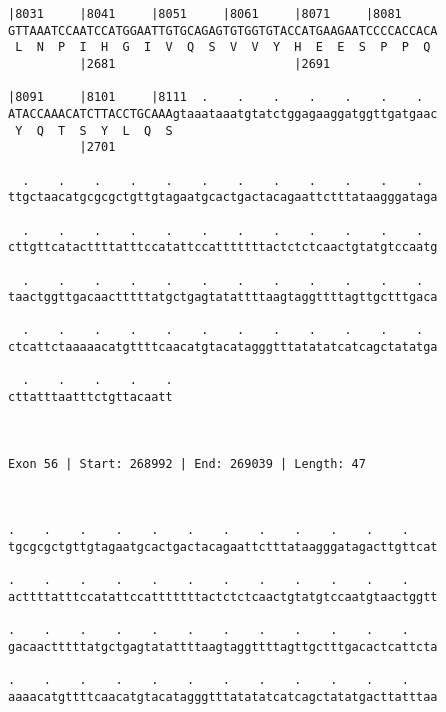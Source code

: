 \documentclass{article}
\begin{document}
\begin{Verbatim}
|8031     |8041     |8051     |8061     |8071     |8081     
GTTAAATCCAATCCATGGAATTGTGCAGAGTGTGGTGTACCATGAAGAATCCCCACCACA
 L  N  P  I  H  G  I  V  Q  S  V  V  Y  H  E  E  S  P  P  Q 
          |2681                         |2691               
  
|8091     |8101     |8111  .    .    .    .    .    .    .  
ATACCAAACATCTTACCTGCAAAgtaaataaatgtatctggagaaggatggttgatgaac
 Y  Q  T  S  Y  L  Q  S                                     
          |2701                                             
  
  .    .    .    .    .    .    .    .    .    .    .    .  
ttgctaacatgcgcgctgttgtagaatgcactgactacagaattctttataagggataga
                                                            
  .    .    .    .    .    .    .    .    .    .    .    .  
cttgttcatacttttatttccatattccatttttttactctctcaactgtatgtccaatg
                                                            
  .    .    .    .    .    .    .    .    .    .    .    .  
taactggttgacaactttttatgctgagtatattttaagtaggttttagttgctttgaca
                                                            
  .    .    .    .    .    .    .    .    .    .    .    .  
ctcattctaaaaacatgttttcaacatgtacatagggtttatatatcatcagctatatga
                                                            
  .    .    .    .    .
cttatttaatttctgttacaatt
                       
                       
 
Exon 56 | Start: 268992 | End: 269039 | Length: 47



.    .    .    .    .    .    .    .    .    .    .    .    
tgcgcgctgttgtagaatgcactgactacagaattctttataagggatagacttgttcat
                                                            
.    .    .    .    .    .    .    .    .    .    .    .    
acttttatttccatattccatttttttactctctcaactgtatgtccaatgtaactggtt
                                                            
.    .    .    .    .    .    .    .    .    .    .    .    
gacaactttttatgctgagtatattttaagtaggttttagttgctttgacactcattcta
                                                            
.    .    .    .    .    .    .    .    .    .    .    .    
aaaacatgttttcaacatgtacatagggtttatatatcatcagctatatgacttatttaa
                                                            

\end{Verbatim}
\end{document}
